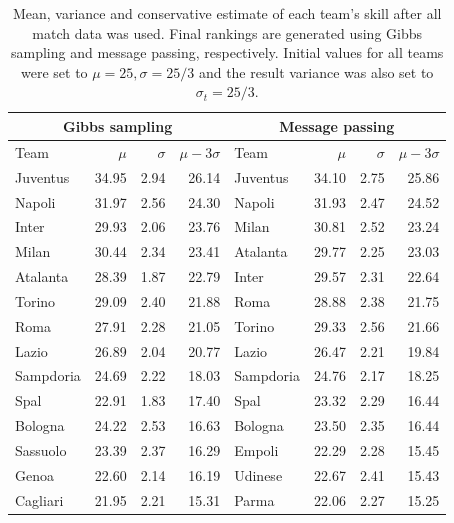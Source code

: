 \documentclass{article}
\begin{document}
		\begin{table}[t]
			\caption{Mean, variance and conservative estimate of each team's skill after all match data was used. Final rankings are generated using Gibbs sampling and message passing, respectively. Initial values for all teams were set to $ \mu=25, \sigma=25/3 $ and the result variance was also set to $ \sigma_t=25/3 $. }
			\label{tab:q4}
			\centering
			\footnotesize
			\begin{tabular}{lrrr|lrrr}
				\toprule
				\multicolumn{4}{c}{Gibbs sampling} & \multicolumn{4}{c}{Message passing} \\
				\midrule
				Team     		& $ \mu $ & $ \sigma $ & $ \mu - 3\sigma $ & Team & $ \mu $ & $ \sigma $ & $ \mu-3\sigma $\\
				\midrule
				Juventus   &  34.95  &  2.94  &  26.14  &  Juventus    &  34.10  &  2.75  & 25.86 \\
				Napoli     &  31.97  &  2.56  &  24.30  &  Napoli      &  31.93  &  2.47  & 24.52 \\
				Inter      &  29.93  &  2.06  &  23.76  &  Milan       &  30.81  &  2.52  & 23.24 \\
				Milan      &  30.44  &  2.34  &  23.41  &  Atalanta    &  29.77  &  2.25  & 23.03 \\
				Atalanta   &  28.39  &  1.87  &  22.79  &  Inter       &  29.57  &  2.31  & 22.64 \\
				Torino     &  29.09  &  2.40  &  21.88  &  Roma        &  28.88  &  2.38  & 21.75 \\
				Roma       &  27.91  &  2.28  &  21.05  &  Torino      &  29.33  &  2.56  & 21.66 \\
				Lazio      &  26.89  &  2.04  &  20.77  &  Lazio       &  26.47  &  2.21  & 19.84 \\
				Sampdoria  &  24.69  &  2.22  &  18.03  &  Sampdoria   &  24.76  &  2.17  & 18.25 \\
				Spal       &  22.91  &  1.83  &  17.40  &  Spal        &  23.32  &  2.29  & 16.44 \\
				Bologna    &  24.22  &  2.53  &  16.63  &  Bologna     &  23.50  &  2.35  & 16.44 \\
				Sassuolo   &  23.39  &  2.37  &  16.29  &  Empoli      &  22.29  &  2.28  & 15.45 \\
				Genoa      &  22.60  &  2.14  &  16.19  &  Udinese     &  22.67  &  2.41  & 15.43 \\
				Cagliari   &  21.95  &  2.21  &  15.31  &  Parma       &  22.06  &  2.27  & 15.25 \\

\end{tabular}
\end{table}
\end{document}
